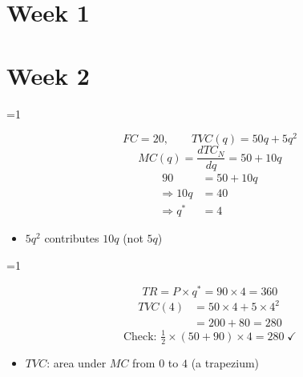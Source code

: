\documentclass{beamer}
\newcommand{\showanswers}{0}
\begin{document}
\section{Week 1}



\section{Week 2}

\ifnum\showanswers=1
\begin{frame}[plain,label=w2_ans_q11]
  \Large
  \[
    \tag{M1}\;FC = 20, \qquad TVC(q) = 50q + 5q^2
  \]
  \[
    \tag{M2}\;MC(q) = \frac{dTC_N}{dq} = 50 + 10q
  \]
  \begin{align*}
    \tag{M3}\;90 &= 50 + 10q\\
    \Rightarrow 10q &= 40\\
    \Rightarrow q^* &= 4
  \end{align*}

  \vspace{0.3em}
  \begin{itemize}\Large
    \item $5q^2$ contributes $10q$ (not $5q$)
  \end{itemize}
\end{frame}
\fi

\ifnum\showanswers=1
\begin{frame}[plain,label=w2_ans_q12a]
  \Large
  \[
    \tag{M4}\;TR = P \times q^* = 90 \times 4 = 360
  \]
  \begin{align*}
    \tag{M5}\;TVC(4) &= 50 \times 4 + 5 \times 4^2\\
                     &= 200 + 80 = 280
  \end{align*}
  \[
    \tag{M6}\;\text{Check: } \tfrac{1}{2} \times (50 + 90) \times 4 = 280 \;\checkmark
  \]

  \vspace{0.3em}
  \begin{itemize}\Large
    \item $TVC$: area under $MC$ from $0$ to $4$ (a trapezium)
  \end{itemize}
\end{frame}
\fi
\end{document}
